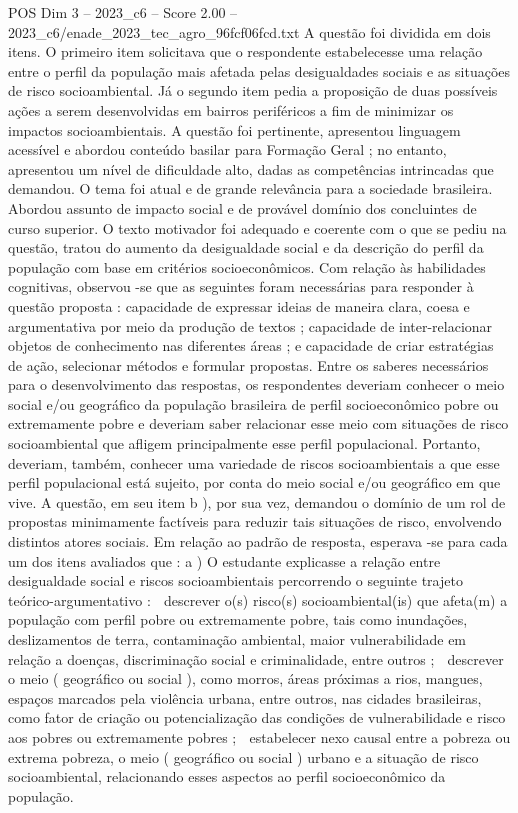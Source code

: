\begin{textsample}{POS Dim 3 – 2023\_c6 – Score 2.00 – 2023\_c6/enade\_2023\_tec\_agro\_96fcf06fcd.txt}
A questão foi dividida em dois itens.
O primeiro item solicitava que o respondente estabelecesse uma relação entre o perfil da população mais afetada pelas desigualdades sociais e as situações de risco socioambiental.
Já o segundo item pedia a proposição de duas possíveis ações a serem desenvolvidas em bairros periféricos a fim de minimizar os impactos socioambientais.
A questão foi pertinente, apresentou linguagem acessível e abordou conteúdo basilar para Formação Geral ; no entanto, apresentou um nível de dificuldade alto, dadas as competências intrincadas que demandou.
O tema foi atual e de grande relevância para a sociedade brasileira.
Abordou assunto de impacto social e de provável domínio dos concluintes de curso superior.
O texto motivador foi adequado e coerente com o que se pediu na questão, tratou do aumento da desigualdade social e da descrição do perfil da população com base em critérios socioeconômicos.
Com relação às habilidades cognitivas, observou -se que as seguintes foram necessárias para responder à questão proposta : capacidade de expressar ideias de maneira clara, coesa e argumentativa por meio da produção de textos ; capacidade de inter-relacionar objetos de conhecimento nas diferentes áreas ; e capacidade de criar estratégias de ação, selecionar métodos e formular propostas.
Entre os saberes necessários para o desenvolvimento das respostas, os respondentes deveriam conhecer o meio social e/ou geográfico da população brasileira de perfil socioeconômico pobre ou extremamente pobre e deveriam saber relacionar esse meio com situações de risco socioambiental que afligem principalmente esse perfil populacional.
Portanto, deveriam, também, conhecer uma variedade de riscos socioambientais a que esse perfil populacional está sujeito, por conta do meio social e/ou geográfico em que vive.
A questão, em seu item b ), por sua vez, demandou o domínio de um rol de propostas minimamente factíveis para reduzir tais situações de risco, envolvendo distintos atores sociais.
Em relação ao padrão de resposta, esperava -se para cada um dos itens avaliados que : a ) O estudante explicasse a relação entre desigualdade social e riscos socioambientais percorrendo o seguinte trajeto teórico-argumentativo :  descrever o(s) risco(s) socioambiental(is) que afeta(m) a população com perfil pobre ou extremamente pobre, tais como inundações, deslizamentos de terra, contaminação ambiental, maior vulnerabilidade em relação a doenças, discriminação social e criminalidade, entre outros ;  descrever o meio ( geográfico ou social ), como morros, áreas próximas a rios, mangues, espaços marcados pela violência urbana, entre outros, nas cidades brasileiras, como fator de criação ou potencialização das condições de vulnerabilidade e risco aos pobres ou extremamente pobres ;  estabelecer nexo causal entre a pobreza ou extrema pobreza, o meio ( geográfico ou social ) urbano e a situação de risco socioambiental, relacionando esses aspectos ao perfil socioeconômico da população.

\end{textsample}
